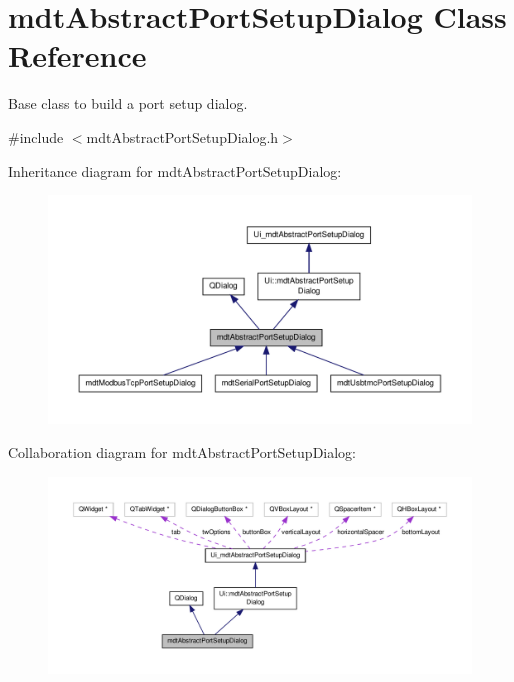 \hypertarget{classmdt_abstract_port_setup_dialog}{\section{mdt\-Abstract\-Port\-Setup\-Dialog Class Reference}
\label{classmdt_abstract_port_setup_dialog}
}


Base class to build a port setup dialog.  




{\ttfamily \#include $<$mdt\-Abstract\-Port\-Setup\-Dialog.\-h$>$}



Inheritance diagram for mdt\-Abstract\-Port\-Setup\-Dialog\-:
\nopagebreak
\begin{figure}[H]
\begin{center}
\leavevmode
\includegraphics[width=350pt]{classmdt_abstract_port_setup_dialog__inherit__graph}
\end{center}
\end{figure}


Collaboration diagram for mdt\-Abstract\-Port\-Setup\-Dialog\-:
\nopagebreak
\begin{figure}[H]
\begin{center}
\leavevmode
\includegraphics[width=350pt]{classmdt_abstract_port_setup_dialog__coll__graph}
\end{center}
\end{figure}
